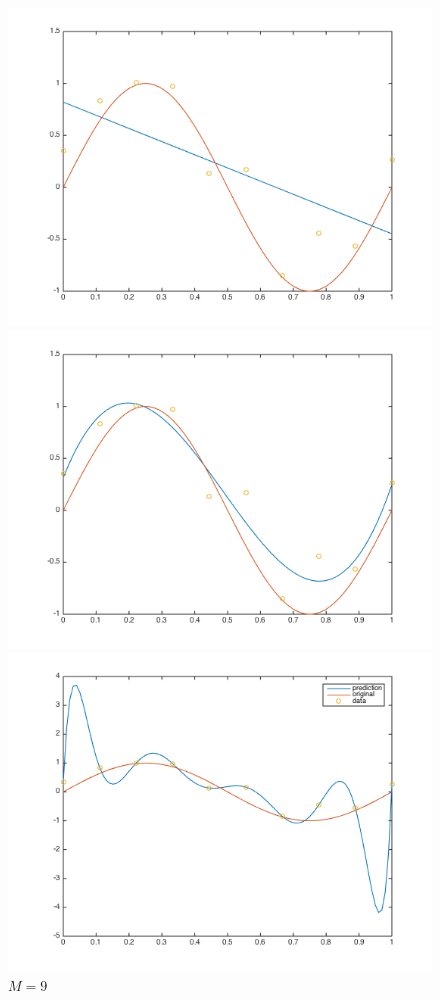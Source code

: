 \documentclass[10pt,letterpaper]{article}
\begin{document}
\begin{figure}[h]
  \includegraphics[width=\linewidth]{figures/basism1.png}
  \caption{$M = 1$}\label{fig:basism1}
\endminipage\hfill
{}
  \includegraphics[width=\linewidth]{figures/basism3.png}
  \caption{$M = 3$}\label{fig:basism3}
\endminipage\hfill
{}
  \includegraphics[width=\linewidth]{figures/basism9.png}
  \caption{$M = 9$}\label{fig:basism9}
\endminipage
\end{figure}
\end{document}
